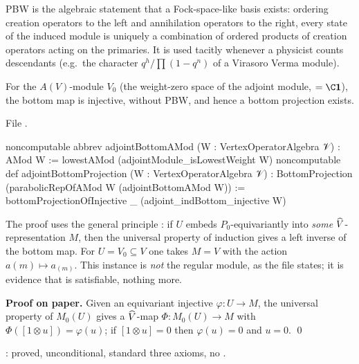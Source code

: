 \begin{physics}
PBW is the algebraic statement that a Fock-space-like basis exists: ordering creation operators to the left and
annihilation operators to the right, every state of the induced module is uniquely a combination of ordered products of
creation operators acting on the primaries. It is used tacitly whenever a physicist counts descendants (e.g.\ the character
$q^h/\prod(1-q^n)$ of a Virasoro Verma module).
\end{physics}

\begin{theorem}\label{l13:thm:adjoint}
For the $A(V)$-module $V_0$ (the weight-zero space of the adjoint module, $=\C\lthirteenvac$), the bottom map is injective,
without PBW, and hence a bottom projection exists.
\end{theorem}
\noindent File .
\begin{leancode}
noncomputable abbrev adjointBottomAMod (W : VertexOperatorAlgebra 𝒱) : AMod W :=
  lowestAMod (adjointModule_isLowestWeight W)
noncomputable def adjointBottomProjection (W : VertexOperatorAlgebra 𝒱) :
    BottomProjection (parabolicRepOfAMod W (adjointBottomAMod W)) :=
  bottomProjectionOfInjective _ (adjoint_indBottom_injective W)
\end{leancode}

\begin{dictionary}
The proof uses the general principle : if $U$ embeds $P_0$-equivariantly
into \emph{some} $\widehat{V}$-representation $M$, then the universal property of induction gives a left inverse of the
bottom map. For $U = V_0\subseteq V$ one takes $M = V$ with the action $a(m)\mapsto a_{(m)}$. This instance is \emph{not}
the regular module, as the file states; it is evidence that  is satisfiable, nothing more.
\end{dictionary}

\textbf{Proof on paper.} Given an equivariant injective $\varphi:U\to M$, the universal property of $M_0(U)$ gives a
$\widehat{V}$-map $\Phi:M_0(U)\to M$ with $\Phi([1\otimes u]) = \varphi(u)$; if $[1\otimes u] = 0$ then $\varphi(u) = 0$
and $u = 0$. \qed

\begin{status}
: proved, unconditional, standard three axioms, no .
\end{status}


